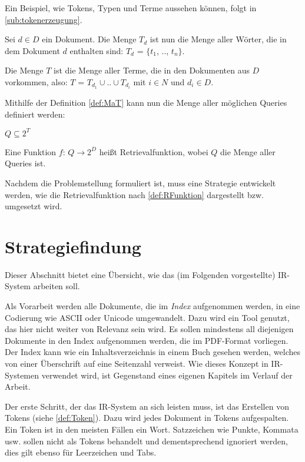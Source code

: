 Ein Beispiel, wie Tokens, Typen und Terme aussehen können, folgt in \ref{sub:tokenerzeugung}.

\begin{defi}\label{def:MaT}
	Sei $d \in D$ ein Dokument. Die Menge $T_d$ ist nun die Menge aller Wörter, die in dem Dokument $d$ enthalten sind: $T_d$ = $\{$$t_1$, .., $t_n$$\}$.
	
	Die Menge $T$ ist die Menge aller Terme, die in den Dokumenten aus $D$ vorkommen, also:
	$T$ = $T_{d_1} \cup .. \cup T_{d_i}$ mit $i \in N$ und $d_i \in D$.
\end{defi}

Mithilfe der Definition \ref{def:MaT} kann nun die Menge aller möglichen Queries definiert werden:

\begin{defi}\label{def:MamQ}
	$Q \subseteq 2^T$
\end{defi}

\begin{defi}[Retrievalfunktion]\label{def:RFunktion}
	Eine Funktion $f$: $Q \rightarrow 2^D$ heißt Retrievalfunktion, wobei $Q$ die Menge aller Queries ist.
\end{defi}

Nachdem die Problemstellung formuliert ist, muss eine Strategie entwickelt werden, wie die Retrievalfunktion nach \cref{def:RFunktion} dargestellt bzw. umgesetzt wird.

\section{Strategiefindung}
Dieser Abschnitt bietet eine Übersicht, wie das (im Folgenden vorgestellte) IR-System arbeiten soll.

Als Vorarbeit werden alle Dokumente, die im \textit{Index} aufgenommen werden, in eine Codierung wie ASCII oder Unicode umgewandelt. Dazu wird ein Tool genutzt, das hier nicht weiter von Relevanz sein wird. Es sollen mindestens all diejenigen Dokumente in den Index aufgenommen werden, die im PDF-Format vorliegen. Der Index kann wie ein Inhaltsverzeichnis in einem Buch gesehen werden, welches von einer Überschrift auf eine Seitenzahl verweist. Wie dieses Konzept in IR-Systemen verwendet wird, ist Gegenstand eines eigenen Kapitels im Verlauf der Arbeit.

Der erste Schritt, der das IR-System an sich leisten muss, ist das Erstellen von Tokens (siehe \cref{def:Token}). Dazu wird jedes Dokument in Tokens aufgespalten. Ein Token ist in den meisten Fällen ein Wort. Satzzeichen wie Punkte, Kommata usw. sollen nicht als Tokens behandelt und dementsprechend ignoriert werden, dies gilt ebenso für Leerzeichen und Tabs.

